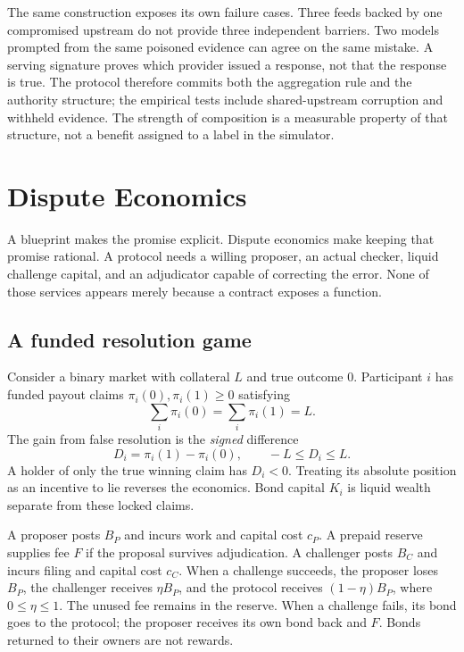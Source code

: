 \documentclass[10pt]{article}
\begin{document}
The same construction exposes its own failure cases. Three feeds backed by one compromised upstream do not provide three independent barriers. Two models prompted from the same poisoned evidence can agree on the same mistake. A serving signature proves which provider issued a response, not that the response is true. The protocol therefore commits both the aggregation rule and the authority structure; the empirical tests include shared-upstream corruption and withheld evidence. The strength of composition is a measurable property of that structure, not a benefit assigned to a label in the simulator.

\section{Dispute Economics}
\label{sec:dispute}

A blueprint makes the promise explicit. Dispute economics make keeping that promise rational. A protocol needs a willing proposer, an actual checker, liquid challenge capital, and an adjudicator capable of correcting the error. None of those services appears merely because a contract exposes a function.

\subsection{A funded resolution game}

Consider a binary market with collateral $L$ and true outcome $0$. Participant $i$ has funded payout claims $\pi_i(0),\pi_i(1)\geq0$ satisfying
\[
\sum_i\pi_i(0)=\sum_i\pi_i(1)=L.
\]
The gain from false resolution is the \emph{signed} difference
\[
D_i=\pi_i(1)-\pi_i(0),\qquad -L\leq D_i\leq L.
\]
A holder of only the true winning claim has $D_i<0$. Treating its absolute position as an incentive to lie reverses the economics. Bond capital $K_i$ is liquid wealth separate from these locked claims.

A proposer posts $B_P$ and incurs work and capital cost $c_P$. A prepaid reserve supplies fee $F$ if the proposal survives adjudication. A challenger posts $B_C$ and incurs filing and capital cost $c_C$. When a challenge succeeds, the proposer loses $B_P$, the challenger receives $\eta B_P$, and the protocol receives $(1-\eta)B_P$, where $0\leq\eta\leq1$. The unused fee remains in the reserve. When a challenge fails, its bond goes to the protocol; the proposer receives its own bond back and $F$. Bonds returned to their owners are not rewards.
\end{document}
